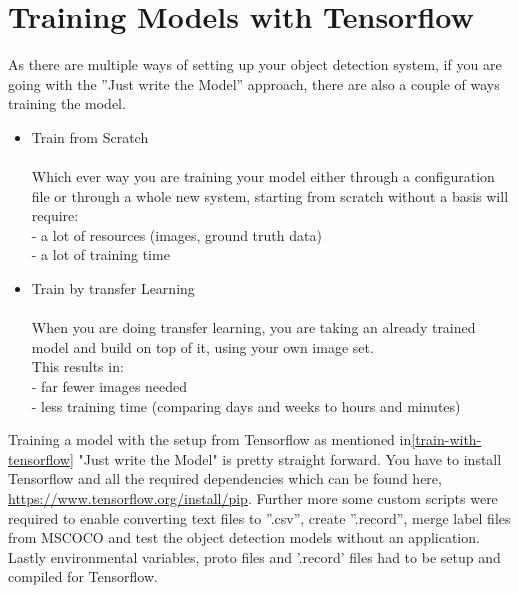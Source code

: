 \section{Training Models with Tensorflow}\label{models-with-tensorflow}
As there are multiple ways of setting up your object detection system, if you are going with the ''Just write the Model'' approach, there
are also a couple of ways training the model.
\begin{itemize}
    \item Train from Scratch \\ \\
        Which ever way you are training your model either through a configuration file or through a whole new system, starting from scratch
        without a basis will require: \\
        {- a lot of resources (images, ground truth data)} \\
        {- a lot of training time} \\
    \item Train by transfer Learning \\ \\
        When you are doing transfer learning, you are taking an already trained model and build on top of it, using your own image set.\\
        This results in: \\
        {- far fewer images needed} \\
        {- less training time (comparing days and weeks to hours and minutes)} \\
\end{itemize}
Training a model with the setup from Tensorflow as mentioned in\ref{train-with-tensorflow} "Just write the Model" is pretty straight forward.
You have to install Tensorflow and all the required dependencies which can be found here, \url{https://www.tensorflow.org/install/pip}.
Further more some custom scripts were required to enable converting text files to ''.csv'', create ''.record'', merge label files from
MSCOCO and test the object detection models without an application. Lastly environmental variables, proto files and '.record' files had to
be setup and compiled for Tensorflow.
\newpage \noindent
